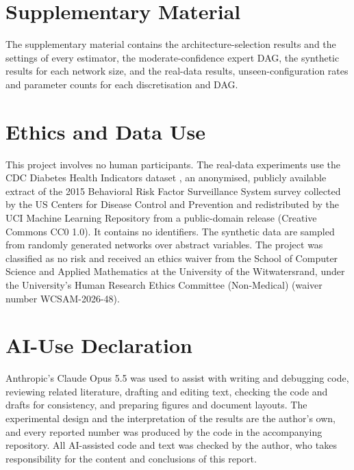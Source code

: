 \documentclass[a4paper,fleqn]{cas-dc}
\begin{document}
\section*{Supplementary Material}

The supplementary material contains the architecture-selection results and the settings of every estimator, the moderate-confidence expert DAG, the synthetic results for each network size, and the real-data results, unseen-configuration rates and parameter counts for each discretisation and DAG.

\section*{Ethics and Data Use}

This project involves no human participants. The real-data experiments use the CDC Diabetes Health Indicators dataset \citep{cdc_diabetes_2023}, an anonymised, publicly available extract of the 2015 Behavioral Risk Factor Surveillance System survey collected by the US Centers for Disease Control and Prevention and redistributed by the UCI Machine Learning Repository from a public-domain release (Creative Commons CC0 1.0). It contains no identifiers. The synthetic data are sampled from randomly generated networks over abstract variables. The project was classified as no risk and received an ethics waiver from the School of Computer Science and Applied Mathematics at the University of the Witwatersrand, under the University's Human Research Ethics Committee (Non-Medical) (waiver number WCSAM-2026-48).

\section*{AI-Use Declaration}

Anthropic's Claude Opus 5.5 was used to assist with writing and debugging code, reviewing related literature, drafting and editing text, checking the code and drafts for consistency, and preparing figures and document layouts. The experimental design and the interpretation of the results are the author's own, and every reported number was produced by the code in the accompanying repository. All AI-assisted code and text was checked by the author, who takes responsibility for the content and conclusions of this report.



\end{document}
